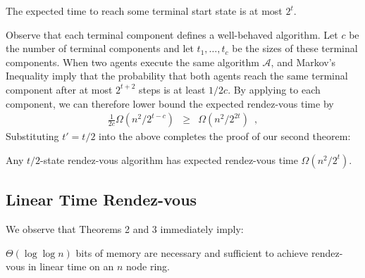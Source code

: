 \documentclass[lotsofwhite]{patmorin}
\begin{document}
\begin{lem}
The expected time to reach some terminal start state is at most $2^t$.
\end{lem}

Observe that each terminal component defines a well-behaved algorithm.
Let $c$ be the number of terminal components and let $t_1,\ldots,t_c$ be
the sizes of these terminal components.  When two agents execute the same
algorithm $\mathcal{A}$,  and Markov's Inequality
imply that the probability
that both agents reach the same terminal component after at most $2^{t+2}$
steps is at least $1/2c$.  By applying  to each component, we can therefore lower bound the expected rendez-vous time by
\begin{eqnarray*}
  \frac{1}{2c}\Omega(n^2/2^{t-c})
    & \ge & \Omega(n^2/2^{2t}) \enspace ,
\end{eqnarray*}
Substituting $t'=t/2$ into the above completes the proof of our second theorem:

\begin{thm}
Any $t/2$-state rendez-vous algorithm has expected rendez-vous time
$\Omega(n^2/2^{t})$.
\end{thm}

\subsection{Linear Time Rendez-vous}

We observe that Theorems 2 and 3 immediately imply:

\begin{thm}
$\Theta( \log \log n)$ bits of memory are necessary and sufficient to 
achieve rendez-vous in linear time on an $n$ node ring.
\end{thm}

\newpage


\end{document}
